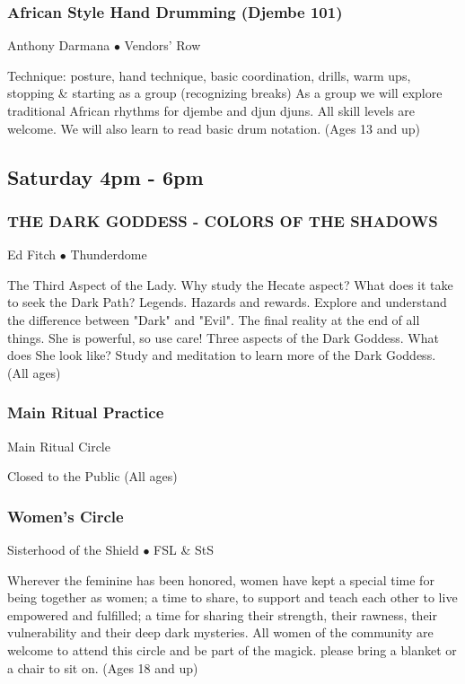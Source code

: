 \subsubsection{African Style Hand Drumming (Djembe 101)}
\label{Sat-Darmana1}
{\small Anthony Darmana $\bullet$  Vendors' Row}

 Technique: posture, hand technique, basic coordination, drills, warm ups, stopping \& starting as a group (recognizing breaks) As a group we will explore traditional African rhythms for djembe and djun djuns. All skill levels are welcome. We will also learn to read basic drum notation. {\small (Ages 13 and up)}

\subsection{Saturday 4pm - 6pm}

\subsubsection{THE DARK GODDESS - COLORS OF THE SHADOWS}
\label{Sat-Fitch3}
{\small Ed Fitch $\bullet$  Thunderdome}

 The Third Aspect of the Lady.  Why study the Hecate aspect? What does it take to seek the Dark Path?  Legends.  Hazards and rewards.  Explore and understand the difference between "Dark" and "Evil".  The final reality at the end of all things.  She is powerful, so use care! Three aspects of the Dark Goddess.  What does She look like?  Study and meditation to learn more of the Dark Goddess. {\small (All ages)}

\subsubsection{Main Ritual Practice}
\label{Sat-Prac4}
{\small  Main Ritual Circle}

 Closed to the Public {\small (All ages)}

\subsubsection{Women's Circle}
\label{Sat-SOS1}
{\small Sisterhood of the Shield $\bullet$  FSL \& StS}

 Wherever the feminine has been honored, women have kept a special time for being together as women; a time to share, to support and teach each other to live empowered and fulfilled; a time for sharing their strength, their rawness, their vulnerability and their deep dark mysteries.  All women of the community are welcome to attend this circle and be part of the magick. please bring a blanket or a chair to sit on. {\small (Ages 18 and up)}

